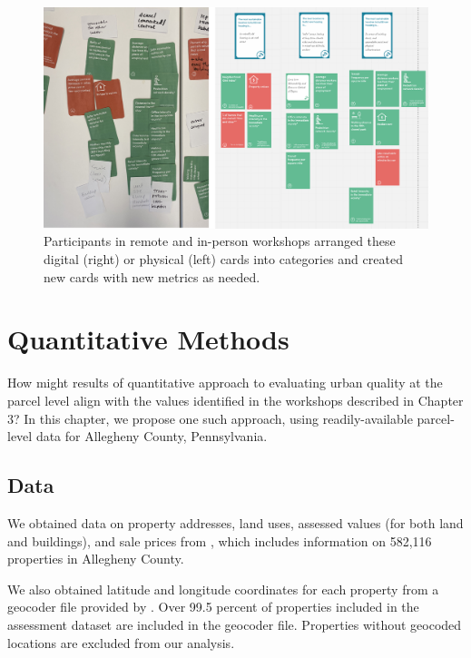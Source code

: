 \documentclass[
]{book}
\begin{document}
\begin{figure}
\includegraphics[width=1\linewidth]{04_figures/fig_3c} \caption{Participants in remote and in-person workshops arranged these digital (right) or physical (left) cards into categories and created new cards with new metrics as needed.}\label{fig:fig3c}
\end{figure}

\hypertarget{quantitative-methods}{%
\chapter{Quantitative Methods}\label{quantitative-methods}}

How might results of quantitative approach to evaluating urban quality at the
parcel level align with the values identified in the workshops described in
Chapter 3? In this chapter, we propose one such approach, using
readily-available parcel-level data for Allegheny County, Pennsylvania.

\hypertarget{data}{%
\section{Data}\label{data}}

We obtained data on property addresses, land uses, assessed values (for both
land and buildings), and sale prices
from \citet{allegheny_county_office_of_property_assessments_allegheny_2022}, which
includes information on 582,116 properties in Allegheny County.

We also obtained latitude and longitude coordinates for each property from a
geocoder file provided by \citet{western_pennsylvania_regional_data_center_geocoders_2021}.
Over 99.5 percent of properties included in the assessment dataset are included
in the geocoder file. Properties without geocoded locations are excluded from
our analysis.
\end{document}
